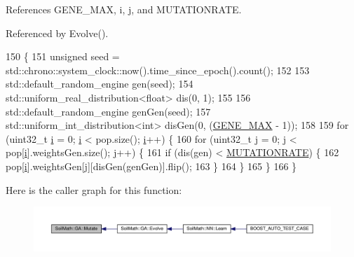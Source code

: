 References G\+E\+N\+E\+\_\+\+M\+A\+X, i, j, and M\+U\+T\+A\+T\+I\+O\+N\+R\+A\+T\+E.



Referenced by Evolve().


\begin{DoxyCode}
150                                  \{
151   \textcolor{keywordtype}{unsigned} seed = std::chrono::system\_clock::now().time\_since\_epoch().count();
152 
153   std::default\_random\_engine gen(seed);
154   std::uniform\_real\_distribution<float> dis(0, 1);
155 
156   std::default\_random\_engine genGen(seed);
157   std::uniform\_int\_distribution<int> disGen(0, (\hyperlink{_soil_math_types_8h_aa5e1eb1a998e5ed69af2076cf318df4b}{GENE\_MAX} - 1));
158 
159   \textcolor{keywordflow}{for} (uint32\_t \hyperlink{_comparision_pictures_2_createtest_image_8m_a6f6ccfcf58b31cb6412107d9d5281426}{i} = 0; \hyperlink{_comparision_pictures_2_createtest_image_8m_a6f6ccfcf58b31cb6412107d9d5281426}{i} < pop.size(); \hyperlink{_comparision_pictures_2_createtest_image_8m_a6f6ccfcf58b31cb6412107d9d5281426}{i}++) \{
160     \textcolor{keywordflow}{for} (uint32\_t \hyperlink{_comparision_pictures_2_createtest_image_8m_ac86694252f8dfdb19aaeadc4b7c342c6}{j} = 0; \hyperlink{_comparision_pictures_2_createtest_image_8m_ac86694252f8dfdb19aaeadc4b7c342c6}{j} < pop[\hyperlink{_comparision_pictures_2_createtest_image_8m_a6f6ccfcf58b31cb6412107d9d5281426}{i}].weightsGen.size(); \hyperlink{_comparision_pictures_2_createtest_image_8m_ac86694252f8dfdb19aaeadc4b7c342c6}{j}++) \{
161       \textcolor{keywordflow}{if} (dis(gen) < \hyperlink{_soil_math_types_8h_a609754629b7669df73d7e8edda337162}{MUTATIONRATE}) \{
162         pop[\hyperlink{_comparision_pictures_2_createtest_image_8m_a6f6ccfcf58b31cb6412107d9d5281426}{i}].weightsGen[\hyperlink{_comparision_pictures_2_createtest_image_8m_ac86694252f8dfdb19aaeadc4b7c342c6}{j}][disGen(genGen)].flip();
163       \}
164     \}
165   \}
166 \}
\end{DoxyCode}


Here is the caller graph for this function\+:\nopagebreak
\begin{figure}[H]
\begin{center}
\leavevmode
\includegraphics[width=350pt]{class_soil_math_1_1_g_a_a489f2afd54086c14f45b654aeec0fe3c_icgraph}
\end{center}
\end{figure}


